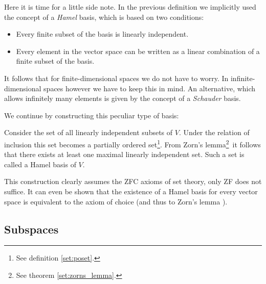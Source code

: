 	\begin{remark}
		Here it is time for a little side note. In the previous definition we implicitly used the concept of a \textit{Hamel} basis, which is based on two conditions:
		\begin{itemize}
			\item Every finite subset of the basis is linearly independent.
			\item Every element in the vector space can be written as a linear combination of a finite subset of the basis.
		\end{itemize}
		It follows that for finite-dimensional spaces we do not have to worry. In infinite-dimensional spaces however we have to keep this in mind. An alternative, which allows infinitely many elements is given by the concept of a \textit{Schauder} basis.
	\end{remark}
	
	We continue by constructing this peculiar type of basis:
	\begin{construct}
		Consider the set of all linearly independent subsets of $V$. Under the relation of inclusion this set becomes a partially ordered set\footnote{See definition \ref{set:poset}.}. From Zorn's lemma\footnote{See theorem \ref{set:zorns_lemma}.}\ it follows that there exists at least one maximal linearly independent set. Such a set is called a Hamel basis of $V$.
	\end{construct}
	\begin{remark*}
		This construction clearly assumes the ZFC axioms of set theory, only ZF does not suffice. It can even be shown that the existence of a Hamel basis for every vector space is equivalent to the axiom of choice (and thus to Zorn's lemma ).
	\end{remark*}
    
\subsection{Subspaces}


